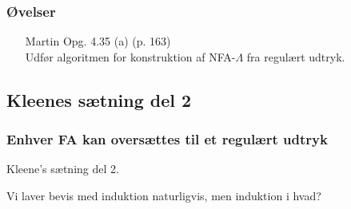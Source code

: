 \begin{frame}
\frametitle{Øvelser}
\begin{itemize}
\item [Martin] Opg. 4.35 (a) (p. 163)\\
Udfør algoritmen for konstruktion af NFA-$\Lambda$ fra regulært udtryk. 
\end{itemize}
\end{frame}
\subsection{Kleenes sætning del 2}
\begin{frame}
  \frametitle{Enhver FA kan oversættes til et regulært udtryk}
Kleene's sætning del 2.

Vi laver bevis med induktion naturligvis, men induktion i hvad?
\end{frame}

